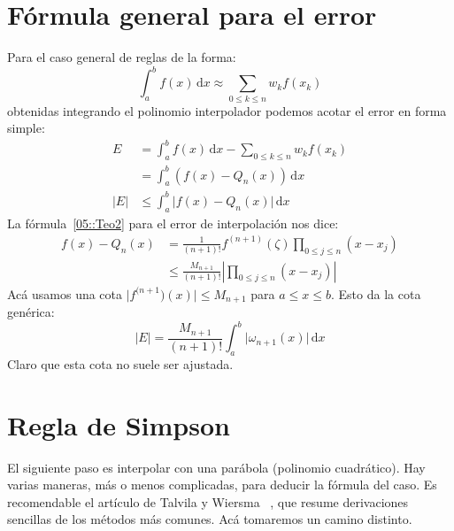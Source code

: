 \section{Fórmula general para el error}
\label{sec:general-quadrature-error}

  Para el caso general de reglas de la forma:
  \begin{equation*}
    \int_a^b f(x) \, \mathrm{d} x
       \approx \sum_{0 \le k \le n} w_k f(x_k)
  \end{equation*}
  obtenidas integrando el polinomio interpolador
  podemos acotar el error en forma simple:
  \begin{align*}
    E
      &=   \int_a^b f(x) \, \mathrm{d} x
             - \sum_{0 \le k \le n} w_k f(x_k) \\
      &=   \int_a^b (f(x) - Q_n(x)) \, \mathrm{d} x \\
    \lvert E \rvert
      &\le \int_a^b \lvert f(x) - Q_n(x) \rvert \, \mathrm{d} x
  \end{align*}
  La fórmula~\ref{05::Teo2} para el error de interpolación nos dice:
  \begin{align*}
    f(x) - Q_n(x)
       &=   \frac{1}{(n + 1)!} f^{(n+1)}(\zeta)
              \prod_{0 \le j \le n}(x - x_j) \\
       &\le \frac{M_{n + 1}}{(n + 1)!}
              \left\lvert \prod_{0 \le j \le n}(x - x_j) \right\rvert
  \end{align*}
  Acá usamos una cota \(\lvert f^{(n + 1})(x) \rvert \le M_{n + 1}\)
  para \(a \le x \le b\).
  Esto da la cota genérica:
  \begin{equation}
    \label{eq:general-quadrature-error}
    \lvert E \rvert
      = \frac{M_{n + 1}}{(n + 1)!}
          \int_a^b \lvert \omega_{n + 1}(x) \rvert \, \mathrm{d} x
  \end{equation}
  Claro que esta cota no suele ser ajustada.

\section{Regla de Simpson}
\label{sec:regla-de-simpson}

  El siguiente paso es interpolar con una parábola
  (polinomio cuadrático).
  Hay varias maneras,
  más o menos complicadas,
  para deducir la fórmula del caso.
  Es recomendable el artículo de Talvila y Wiersma~%
    \cite{talvila12:_simpl_deriv_basic_quadr_formul},
  que resume derivaciones sencillas de los métodos más comunes.
  Acá tomaremos un camino distinto.

